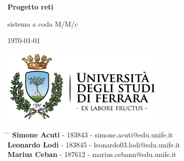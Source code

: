 \documentclass[12pt,a4paper]{article}
\begin{document}
	
	\newcommand{\subf}[2]{%
		{\small\begin{tabular}[t]{@{}c@{}}
				#1\\#2
		\end{tabular}}%
	}
	
	\begin{titlepage}
		\begin{center}
			\vspace*{3cm}
			
			\Huge
			\textbf{Progetto reti}
			
			\vspace{0.3cm}
			\Huge
			 sistema a coda M/M/$c$
			
			\vspace{0.8cm}
			\large
			\today
			
			
			\vspace{0.5cm}
			\LARGE
			
			
			\vspace{3cm}
			
			\textbf{}
            \includegraphics[width=0.6\textwidth]{logo-unife.png}
			
			\vfill
			
			
			
			\vspace{2.8cm}
			
			
			
			\Large
			
			
			
			
		\end{center}
		\Large
		\begin{tabbing}
			\hspace*{0em}\= \hspace*{0em} \= \kill %
			\>\> \textbf{Simone Acuti} - 183843 - simone.acuti@edu.unife.it\\
			\>\> \textbf{Leonardo Lodi} - 183845 - leonardo03.lodi@edu.unife.it\\
			\>\> \textbf{Marius Ceban} - 187612 - marius.cebann@edu.unife.it\\
		\end{tabbing}
		
\end{titlepage}
\tableofcontents
\newpage
\end{document}
